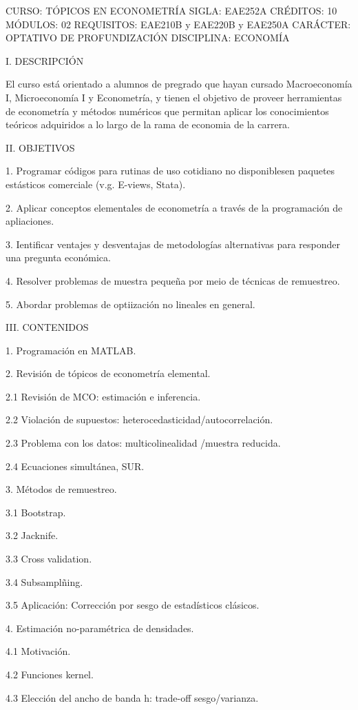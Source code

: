CURSO: TÓPICOS EN ECONOMETRÍA
SIGLA: EAE252A
CRÉDITOS: 10
MÓDULOS: 02
REQUISITOS: EAE210B y EAE220B y EAE250A
CARÁCTER: OPTATIVO DE PROFUNDIZACIÓN
DISCIPLINA: ECONOMÍA


I. DESCRIPCIÓN

El curso está orientado a alumnos de pregrado que hayan cursado Macroeconomía I, Microeconomía I y Econometría, y tienen el objetivo de proveer herramientas 
de econometría y métodos numéricos que permitan aplicar los conocimientos teóricos adquiridos a lo largo de la rama de economia de la carrera.


II. OBJETIVOS

1. Programar códigos para rutinas de uso cotidiano no disponiblesen paquetes estásticos comerciale (v.g. E-views, Stata).

2. Aplicar conceptos elementales de econometría a través de la programación de apliaciones.

3. Ientificar ventajes y desventajas de metodologías alternativas para responder una pregunta económica.

4. Resolver problemas de muestra pequeña por meio de técnicas de remuestreo.

5. Abordar problemas de optiización no lineales en general.


III. CONTENIDOS

1. Programación en MATLAB.


2. Revisión de tópicos de econometría elemental.

2.1 Revisión de MCO: estimación e inferencia.

2.2 Violación de supuestos: heterocedasticidad/autocorrelación.

2.3 Problema con los datos: multicolinealidad /muestra reducida.

2.4 Ecuaciones simultánea, SUR.


3. Métodos de remuestreo.

3.1 Bootstrap.

3.2 Jacknife.

3.3 Cross validation.

3.4 Subsamplñing.

3.5 Aplicación: Corrección por sesgo de estadísticos clásicos.


4. Estimación no-paramétrica de densidades.

4.1 Motivación.

4.2 Funciones kernel.

4.3 Elección del ancho de banda h: trade-off sesgo/varianza.

